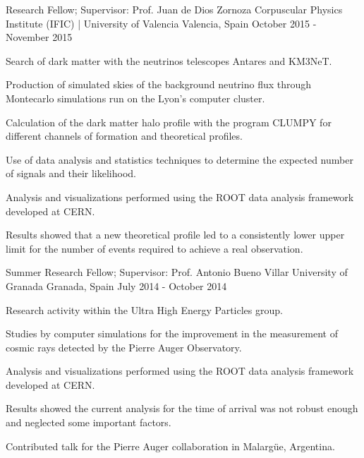 \begin{cventries}
\cventry
    {Research Fellow; Supervisor: Prof. Juan de Dios Zornoza}
    {Corpuscular Physics Institute (IFIC) | University of Valencia}
    {Valencia, Spain}
    {October 2015 - November 2015}
    {
      \begin{cvitems}
        \item {Search of dark matter with the neutrinos telescopes Antares and KM3NeT.}
        \item {Production of simulated skies of the background neutrino flux through  Montecarlo simulations run on the Lyon's computer cluster.}
        \item {Calculation of the dark matter halo profile with the program CLUMPY for different channels of formation and theoretical profiles.}
        \item {Use of data analysis and statistics techniques to determine the expected number of signals and their likelihood.}
        \item {Analysis and visualizations performed using the ROOT data analysis framework developed at CERN.}
        \item {Results showed that a new theoretical profile led to a consistently lower upper limit for the number of events required to achieve a real observation.}
        \end{cvitems}
    }\vspace{-10pt}

\cventry
    {Summer Research Fellow; Supervisor: Prof. Antonio Bueno Villar}
    {University of Granada}
    {Granada, Spain}
    {July 2014 - October 2014}
    {
      \begin{cvitems}
        \item {Research activity within the Ultra High Energy Particles group.}
        \item {Studies by computer simulations for the improvement in the measurement of cosmic rays detected by the Pierre Auger Observatory.}
        \item {Analysis and visualizations performed using the ROOT data analysis framework developed at CERN.}
        \item {Results showed the current analysis for the time of arrival was not robust enough and neglected some important factors.}
        \item {Contributed talk for the Pierre Auger collaboration in Malargüe, Argentina.}
      \end{cvitems}
    }\vspace{-10pt}

\end{cventries}
